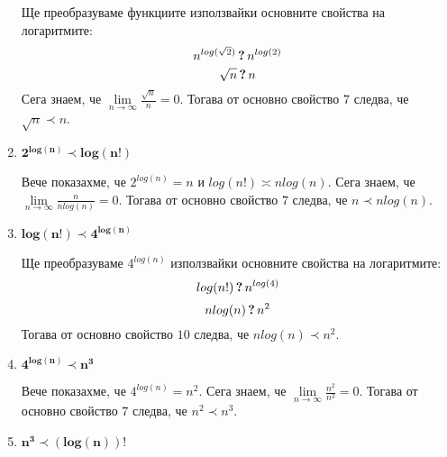 \begin{solution}
\begin{enumerate}[label=\textbf{\arabic*.}]
		Ще преобразуваме функциите използвайки основните свойства на логаритмите:
		\begin{equation*}
			n^{log(\sqrt2)}\,\textbf?\,n^{log(2)}
		\end{equation*}
		\begin{equation*}
			\sqrt n\,\textbf?\,n
		\end{equation*}
		Сега знаем, че $\lim\limits_{n\to\infty}\frac{\sqrt n}{n}=0$. Тогава от основно свойство $\hyperref[mprop-1]{7}$ следва, че $\sqrt n\prec n$.
		
		
		\vspace{0.2cm}
		\item $\bm{2^{log(n)}\prec log(n!)}$
		
		Вече показахме, че $2^{log(n)}=n$ и $log(n!)\asymp nlog(n)$. Сега знаем, че $\lim\limits_{n\to\infty}\frac n{nlog(n)}=0$. Тогава от основно свойство $\hyperref[mprop-1]{7}$ следва, че $n\prec nlog(n)$.
		
		
		\vspace{0.2cm}
		\item $\bm{log(n!)\prec 4^{log(n)}}$
		
		Ще преобразуваме $4^{log(n)}$ използвайки основните свойства на логаритмите:
		\begin{equation*}
			log(n!)\,\textbf?\,n^{log(4)}
		\end{equation*}
		\begin{equation*}
			nlog(n)\,\textbf?\,n^2
		\end{equation*}
		Тогава от основно свойство $\hyperref[mprop-1]{10}$ следва, че $nlog(n)\prec n^2$.
		
		
		\vspace{0.2cm}
		\item $\bm{4^{log(n)}\prec n^3}$
		
		Вече показахме, че $4^{log(n)}=n^2$. Сега знаем, че $\lim\limits_{n\to\infty}\frac{n^2}{n^3}=0$. Тогава от основно свойство $\hyperref[mprop-1]{7}$ следва, че $n^2\prec n^3$.
		
		
		\vspace{0.2cm}
		\item $\bm{n^3\prec(log(n))!}$
		

\end{enumerate}
\end{solution}
